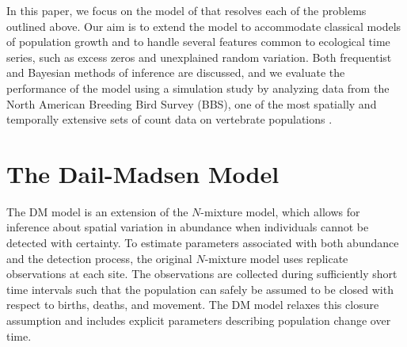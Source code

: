 \documentclass[12pt]{article}
\begin{document}
In this paper, we focus on the model of \citet[henceforth the DM model]{dail_madsen:2011}
that resolves each of the problems outlined above. 
Our aim is to extend the
model to accommodate classical models of population growth and
to handle several features common to ecological
time series, such as excess zeros and unexplained random variation. 
Both frequentist and Bayesian methods of inference are discussed, and
we evaluate the performance of the model using a simulation study by
analyzing data from the North American Breeding Bird Survey (BBS), one of
the most spatially and temporally extensive sets of count data on
vertebrate populations \citep{robbins_etal:1986}.


\section{The Dail-Madsen Model}
\label{sec:dm}

The DM model is an extension of the 
\citet{royle:2004biom} $N$-mixture model, which allows for inference about spatial
variation in abundance when individuals cannot be detected with
certainty. To estimate parameters associated with both abundance 
and the detection process, the original $N$-mixture model uses replicate
observations at each site. The observations are collected during sufficiently
short time intervals such that the population can safely be
assumed to be closed with respect to births, deaths, and movement. The DM
model relaxes this closure assumption and includes explicit parameters
describing population change over time.
\end{document}
